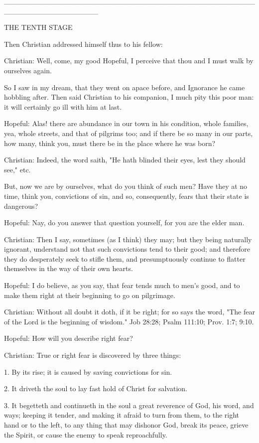 __________________________________________________________________

THE TENTH STAGE

Then Christian addressed himself thus to his fellow:

Christian: Well, come, my good Hopeful, I perceive that thou and I must
walk by ourselves again.

So I saw in my dream, that they went on apace before, and Ignorance he
came hobbling after. Then said Christian to his companion, I much pity
this poor man: it will certainly go ill with him at last.

Hopeful: Alas! there are abundance in our town in his condition, whole
families, yea, whole streets, and that of pilgrims too; and if there be
so many in our parts, how many, think you, must there be in the place
where he was born?

Christian: Indeed, the word saith, "He hath blinded their eyes, lest
they should see," etc.

But, now we are by ourselves, what do you think of such men? Have they
at no time, think you, convictions of sin, and so, consequently, fears
that their state is dangerous?

Hopeful: Nay, do you answer that question yourself, for you are the
elder man.

Christian: Then I say, sometimes (as I think) they may; but they being
naturally ignorant, understand not that such convictions tend to their
good; and therefore they do desperately seek to stifle them, and
presumptuously continue to flatter themselves in the way of their own
hearts.

Hopeful: I do believe, as you say, that fear tends much to men's good,
and to make them right at their beginning to go on pilgrimage.

Christian: Without all doubt it doth, if it be right; for so says the
word, "The fear of the Lord is the beginning of wisdom." Job 28:28;
Psalm 111:10; Prov. 1:7; 9:10.

Hopeful: How will you describe right fear?

Christian: True or right fear is discovered by three things:

1. By its rise; it is caused by saving convictions for sin.

2. It driveth the soul to lay fast hold of Christ for salvation.

3. It begetteth and continueth in the soul a great reverence of God,
his word, and ways; keeping it tender, and making it afraid to turn
from them, to the right hand or to the left, to any thing that may
dishonor God, break its peace, grieve the Spirit, or cause the enemy to
speak reproachfully.

